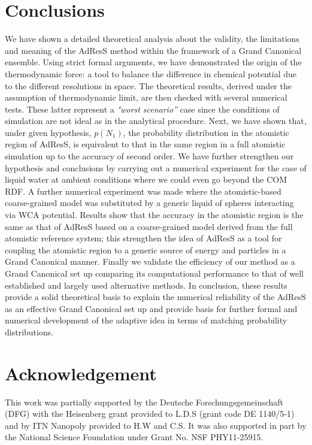 \documentclass[aip,jcp,a4paper,reprint,onecolumn]{revtex4-1}
\begin{document}
\section{Conclusions}
We have shown a detailed theoretical analysis about the validity, the limitations and meaning of the AdResS method within the framework of a Grand Canonical ensemble.
Using strict formal arguments, we have demonstrated the origin of the thermodynamic force: a tool to balance the difference in chemical potential due to the different resolutions in space.
  The theoretical results, derived under the assumption of thermodynamic limit, are then checked with several numerical tests. These latter represent a {\it "worst scenario''} case since the conditions of simulation are not ideal as in the analytical procedure.
Next, we have shown that, under given hypothesis, $p(N_{1})$, the probability distribution in the atomistic region of AdResS, is equivalent to that in the same region in a full atomistic simulation up to the accuracy of second order. We have further strengthen our hypothesis and conclusions by carrying out a numerical experiment for the case of liquid water at ambient conditions where we could even go beyond the COM RDF. 
A further numerical experiment was made where the atomistic-based coarse-grained model was substituted by a generic liquid of spheres interacting via WCA potential. Results show that the accuracy in the atomistic region is the same as that of AdResS based on a coarse-grained model derived from the full atomistic reference system; this strengthen the idea of AdResS as a tool for coupling the atomistic region to a generic source of energy and particles in a Grand Canonical manner. Finally we validate the efficiency of our method as a Grand Canonical set up comparing its computational performance to that of well established and largely used alternative methods.
In conclusion, these results provide a solid theoretical basis to explain the numerical reliability of the AdResS as an effective Grand Canonical set up and provide basis for further formal and numerical development of the adaptive idea in terms of matching probability distributions.


\section*{Acknowledgement}
This work was partially supported by the Deutsche Forschungsgemeinschaft (DFG) with the Heisenberg grant provided to L.D.S (grant code DE 1140/5-1) and by ITN Nanopoly provided to H.W and C.S.
It was also supported in part by the National Science Foundation under Grant No. NSF PHY11-25915.
\end{document}
